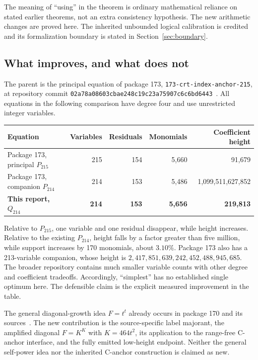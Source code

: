 \documentclass[11pt,a4paper]{article}
\theoremstyle{definition}
\newcommand{\Qdiag}{Q_{214}}
\newcommand{\file}[1]{\nolinkurl{#1}}
\begin{document}
The meaning of ``using'' in the theorem is ordinary mathematical reliance
on stated earlier theorems, not an extra consistency hypothesis. The new
arithmetic changes are proved here. The inherited unbounded logical
calibration is credited and its formalization boundary is stated in
Section~\ref{sec:boundary}.

\subsection{What improves, and what does not}

The parent is the principal equation of package 173,
\file{173-crt-index-anchor-215}, at repository commit
\texttt{02a78a08603cbae248c19c23a75907c6c6bd6443}~\cite{parent173}.
All equations in the following comparison have degree four and use
unrestricted integer variables.

\begin{center}
\small
\begin{tabular}{lrrrr}
\toprule
Equation & Variables & Residuals & Monomials & Coefficient height\\
\midrule
Package 173, principal $P_{215}$ & 215 & 154 & 5,660 & 91,679\\
Package 173, companion $P_{214}$ & 214 & 153 & 5,486 & 1,099,511,627,852\\
\textbf{This report, $\Qdiag$} & \textbf{214} & \textbf{153} & \textbf{5,656} & \textbf{219,813}\\
\bottomrule
\end{tabular}
\end{center}

Relative to $P_{215}$, one variable and one residual disappear, while
height increases. Relative to the existing $P_{214}$, height falls by a
factor greater than five million, while support increases by 170
monomials, about $3.10\%$. Package 173 also has a 213-variable companion,
whose height is $2{,}417{,}851{,}639{,}242{,}452{,}488{,}945{,}685$.
The broader repository contains much smaller variable counts with other
degree and coefficient tradeoffs. Accordingly, ``simplest'' has no
established single optimum here. The defensible claim is the explicit
measured improvement in the table.

The general diagonal-growth idea $F=t^t$ already occurs in package 170
and its sources~\cite{prior170}. The new contribution is the source-specific
label majorant, the amplified diagonal $F=K^K$ with $K=464t^2$, its
application to the range-free C-anchor interface, and the fully emitted
low-height endpoint. Neither the general self-power idea nor the
inherited C-anchor construction is claimed as new.
\end{document}

